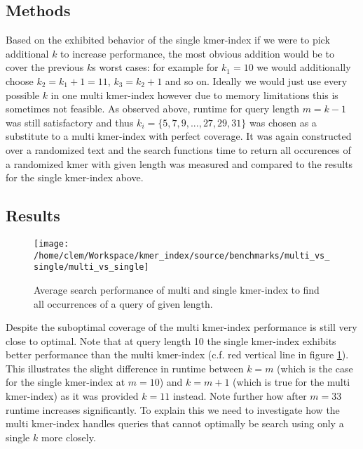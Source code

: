 \subsection{Methods}
Based on the exhibited behavior of the single kmer-index if we were to pick additional
$k$ to increase performance, the most obvious addition would be to cover the previous $k$s
worst cases: for example for $k_{1}=10$ we would additionally
choose $k_{2}=k_{1}+1=11$, $k_{3}=k_{2}+1$ and so on. Ideally we would
just use every possible $k$ in one multi kmer-index however due to memory limitations
this is sometimes not feasible. As observed above, runtime for query length $m=k-1$
was still satisfactory and thus $k_{i}=\{5,7,9,...,27,29,31\}$ was
chosen as a substitute to a multi kmer-index with perfect coverage. It was again constructed
over a randomized text and the search functions time to return all occurences of a randomized kmer with
given length was measured and compared to the results for the single kmer-index above.

\subsection{Results}
\begin{figure}[H]
\texttt{[image: /home/clem/Workspace/kmer\_index/source/benchmarks/multi\_vs\_single/multi\_vs\_single]}
\label{single_vs_multi}
\caption{Average search performance of multi and single kmer-index to find
all occurrences of a query of given length.}
\end{figure}

Despite the suboptimal coverage of the multi kmer-index performance is still very close to optimal. Note that at query
length 10 the single kmer-index exhibits better performance than the multi kmer-index (c.f. red vertical line in figure \ref{single_vs_multi}).
This illustrates the slight difference in runtime between $k=m$ (which is the case for the single kmer-index
at $m=10$) and $k=m+1$ (which is true for the multi kmer-index) as it was provided $k=11$ instead.
Note further how after $m=33$ runtime increases significantly. To explain this we need to investigate how the
multi kmer-index handles queries that cannot optimally be search using only a single $k$ more closely.

